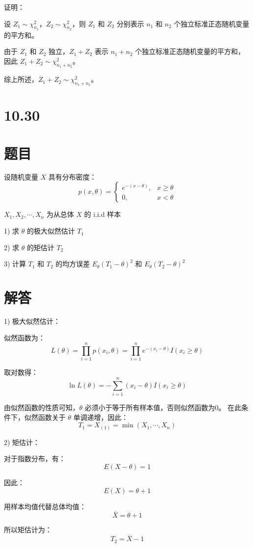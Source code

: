 \documentclass[UTF8]{report}
\theoremstyle{MyLineTheoremStyle} %
\theoremstyle{MyBlockTheoremStyle} %
\theoremstyle{MySubsubsectionStyle} %
\begin{document}
证明：

设 \(Z_1 \sim \chi^2_{n_1}\)，\(Z_2 \sim \chi^2_{n_2}\)，则 \(Z_1\) 和 \(Z_2\) 分别表示 \(n_1\) 和 \(n_2\) 个独立标准正态随机变量的平方和。

由于 \(Z_1\) 和 \(Z_2\) 独立，\(Z_1 + Z_2\) 表示 \(n_1 + n_2\) 个独立标准正态随机变量的平方和，因此 \(Z_1 + Z_2 \sim \chi^2_{n_1 + n_2}\)。

综上所述，\(Z_1 + Z_2 \sim \chi^2_{n_1 + n_2}\)。

\section{10.30}
\section*{题目}
设随机变量 $X$ 具有分布密度：
$$
p(x,\theta)=\begin{cases}
e^{-(x-\theta)}, & x \geq \theta \\
0, & x < \theta
\end{cases}
$$

$X_1,X_2,\cdots,X_n$ 为从总体 $X$ 的 i.i.d 样本

1) 求 $\theta$ 的极大似然估计 $T_1$

2) 求 $\theta$ 的矩估计 $T_2$

3) 计算 $T_1$ 和 $T_2$ 的均方误差 $E_\theta(T_1-\theta)^2$ 和 $E_\theta(T_2-\theta)^2$

\section*{解答}

1) 极大似然估计：

似然函数为：
$$
L(\theta)=\prod_{i=1}^n p(x_i,\theta)=\prod_{i=1}^n e^{-(x_i-\theta)}I(x_i \geq \theta)
$$

取对数得：
$$
\ln L(\theta)=-\sum_{i=1}^n(x_i-\theta)I(x_i \geq \theta)
$$

由似然函数的性质可知，$\theta$ 必须小于等于所有样本值，否则似然函数为0。
在此条件下，似然函数关于 $\theta$ 单调递增，因此：
$$
T_1=X_{(1)}=\min(X_1,\cdots,X_n)
$$

2) 矩估计：

对于指数分布，有：
$$
E(X-\theta)=1
$$

因此：
$$
E(X)=\theta+1
$$

用样本均值代替总体均值：
$$
\bar{X}=\theta+1
$$

所以矩估计为：
$$
T_2=\bar{X}-1
$$
\end{document}
